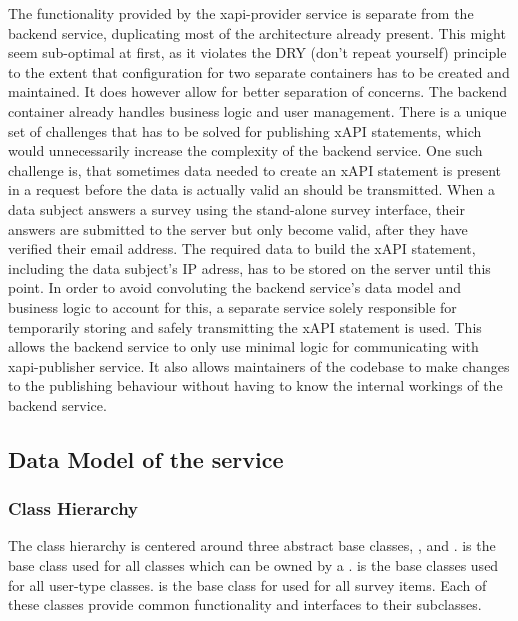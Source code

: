         The functionality provided by the xapi-provider service
        is separate from the backend service, duplicating
        most of the architecture already present. This might seem
        sub-optimal at first, as it violates the DRY (don't repeat yourself)
        principle to the extent that configuration for two separate containers
        has to be created and maintained. It does however allow for better
        separation of concerns. The backend container already
        handles business logic and user management. There is a unique
        set of challenges that has to be solved for publishing xAPI
        statements, which would unnecessarily increase the complexity
        of the backend service. One such challenge is, that sometimes
        data needed to create an xAPI statement is present in a request
        before the data is actually valid an should be transmitted. 
        When a data subject answers a survey using the stand-alone survey
        interface, their answers are submitted to the server but only
        become valid, after they have verified their email address.
        The required data to build the xAPI statement, including the data
        subject's IP adress, has to be stored on the server until this
        point. In order to avoid convoluting the backend service's
        data model and business logic to account for this, a separate
        service solely responsible for temporarily storing and safely 
        transmitting the xAPI statement is used.
        This allows the backend service to only use minimal logic
        for communicating with xapi-publisher service.
        It also allows maintainers of the codebase to make changes
        to the publishing behaviour without having to know the internal
        workings of the backend service.

\subsection{Data Model of the  service}
    \subsubsection{Class Hierarchy}
        The class hierarchy is centered around three abstract base classes,
        ,  and .
         is the base class used for all classes
        which can be owned by a .  is
        the base classes used for all user-type classes. 
        is the base class for used for all survey items.
        Each of these classes provide common functionality and
        interfaces to their subclasses.

